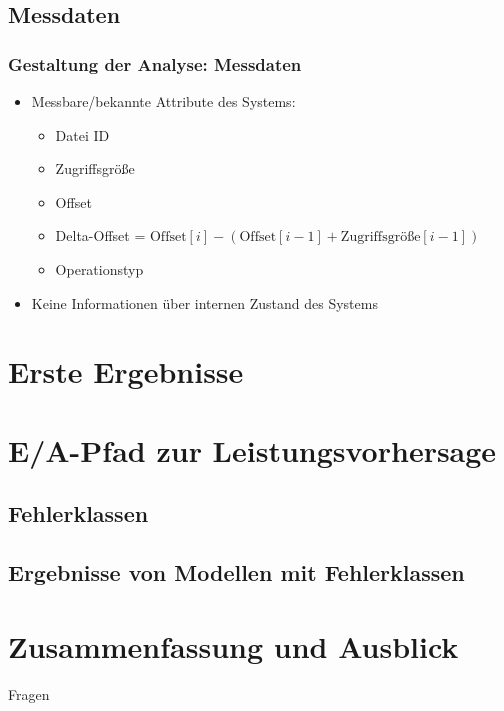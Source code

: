 \documentclass{beamer}
\begin{document}
\subsection{Messdaten}
\begin{frame}
\frametitle{Gestaltung der Analyse: Messdaten}
	\begin{itemize}
		\item Messbare/bekannte Attribute des Systems:
		\begin{itemize}
			\item Datei ID
			\item Zugriffsgröße
			\item Offset
			\item Delta-Offset = $\text{Offset}[i]-(\text{Offset}[i-1]+\text{Zugriffsgröße}[i-1])$
			\item Operationstyp 
		\end{itemize}
		\item Keine Informationen über internen Zustand des Systems
	\end{itemize}
\end{frame}

\section{Erste Ergebnisse}
\section{E/A-Pfad zur Leistungsvorhersage}
\subsection{Fehlerklassen}
\subsection{Ergebnisse von Modellen mit Fehlerklassen}

\section{Zusammenfassung und Ausblick}

\begin{frame}
\Huge{\centerline{Fragen}}
\end{frame}

\end{document}
